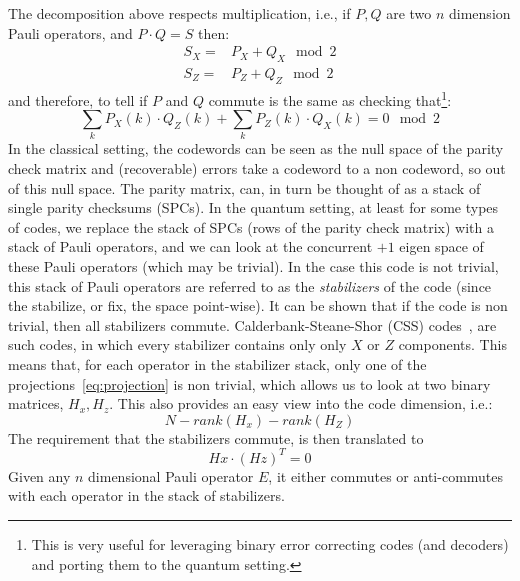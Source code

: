 \noindent The decomposition above respects multiplication, i.e., if \(P,Q\) are two \(n\) dimension Pauli operators, and \(P\cdot Q=S\) then:
\begin{equation}
    \begin{split}
        S_X =& P_X + Q_X \mod 2\\
        S_Z =& P_Z + Q_Z \mod 2
    \end{split}
\end{equation}
and therefore, to tell if \(P\) and \(Q\) commute is the same as checking that\footnote{This is very useful for leveraging binary error correcting codes (and decoders) and porting them to the quantum setting.}:
\begin{equation}
    \sum\limits_{k}P_X(k) \cdot Q_Z(k) +  \sum\limits_{k}P_Z(k) \cdot Q_X(k) = 0 \mod 2
\end{equation}
\noindent In the classical setting, the codewords can be seen as the null space of the parity check matrix and (recoverable) errors take a codeword to a non codeword, so out of this null space. The parity matrix, can, in turn be thought of as a stack of single parity checksums (SPCs). In the quantum setting, at least for some types of codes, we replace the stack of SPCs (rows of the parity check matrix) with a stack of Pauli operators, and we can look at the concurrent \(+1\) eigen space of these Pauli operators (which may be trivial). In the case this code is not trivial, this stack of Pauli operators are referred to as the \emph{stabilizers} of the code (since the stabilize, or fix, the space point-wise). It can be shown that if the code is non trivial, then all stabilizers commute. Calderbank-Steane-Shor (CSS) codes~\cite{calderbank1996good, steane1996error}, are such codes, in which every stabilizer contains only only \(X\) or \(Z\) components. This means that, for each operator in the stabilizer stack, only one of the projections~\ref{eq:projection} is non trivial, which allows us to look at two binary matrices, \(H_x, H_z\). This also provides an easy view into the code dimension, i.e.:
\begin{equation}\label{eq:codeDimension}
    N - rank(H_x) - rank(H_Z)
\end{equation}
The requirement that the stabilizers commute, is then translated to
\begin{equation}\label{eq:dualContaining}
    Hx \cdot (Hz)^T = 0
\end{equation}
Given any \(n\) dimensional Pauli operator \(E\), it either commutes or anti-commutes with each operator in the stack of stabilizers.
